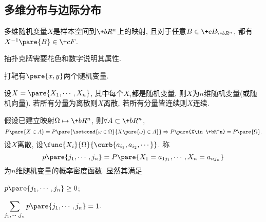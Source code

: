 \documentclass[../Statistics.tex]{subfiles}
\begin{document}


\subsection{多维分布与边际分布} %
\label{sub:多维分布与边际分布}

多维随机变量$X$是样本空间到$\+bR^n$上的映射, 且对于任意$B\in \+cB_{\+bR^n}$, 都有$X^{-1}\pare{B}\in \+cF$.
\begin{ex}
    抽扑克牌需要花色和数字说明其属性.
\end{ex}
\begin{ex}
    打靶有$\pare{x,y}$两个随机变量.
\end{ex}
设$X=\pare{X_1,\cdots, X_n}$, 其中每个$X_i$都是随机变量, 则$X$为$n$维随机变量(或随机向量). 若所有分量为离散则$X$离散, 若所有分量皆连续则$X$连续.
\par
假设已建立映射$\Omega\mapsto \+bR^n$, 则$\forall A \subset \+bR^n$,
\[ P\pare{X\in A} = P\pare{\setcond{\omega \in \Omega}{X\pare{\omega}\in A}} \Rightarrow P\pare{X\in \+bR^n} = P\pare{\Omega}. \]
设$X$离散, 设$\func{X_i}{\Omega}{\curb{a_{i_1}, a_{i_2}, \cdots}}$. 称
\[ p\pare{j_1,\cdots,j_n} = P\pare{X_1 = a_{1j_1},\cdots, X_n = a_{nj_n}} \]
为$n$维随机变量的概率密度函数. 显然其满足
\begin{cenum}
    \item $p\pare{j_1,\cdots,j_n} \ge 0$;
    \item $\displaystyle \sum_{j_1,\cdots,j_n} p\pare{j_1,\cdots, j_n} = 1$.
\end{cenum}
\end{document}
